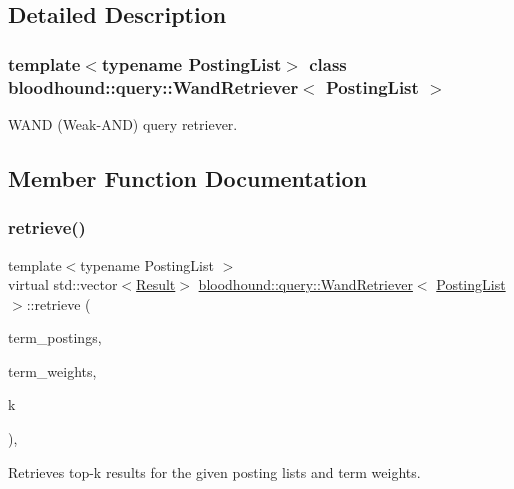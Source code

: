 \subsection{Detailed Description}
\subsubsection*{template$<$typename Posting\+List$>$\newline
class bloodhound\+::query\+::\+Wand\+Retriever$<$ Posting\+List $>$}

W\+A\+ND (Weak-\/\+A\+ND) query retriever. 

\subsection{Member Function Documentation}
\mbox{\label{classbloodhound_1_1query_1_1WandRetriever_a5f3068bc363c16c5b7255a925ea5af8c}} 
\subsubsection{\texorpdfstring{retrieve()}{retrieve()}}
{\footnotesize\ttfamily template$<$typename Posting\+List $>$ \\
virtual std\+::vector$<$\hyperlink{structbloodhound_1_1query_1_1Result}{Result}$>$ \hyperlink{classbloodhound_1_1query_1_1WandRetriever}{bloodhound\+::query\+::\+Wand\+Retriever}$<$ \hyperlink{classbloodhound_1_1PostingList}{Posting\+List} $>$\+::retrieve (\begin{DoxyParamCaption}\item[{const std\+::vector$<$ \hyperlink{classbloodhound_1_1PostingList}{Posting\+List} $>$ \&}]{term\+\_\+postings,  }\item[{const std\+::vector$<$ \hyperlink{structbloodhound_1_1Score}{Score} $>$ \&}]{term\+\_\+weights,  }\item[{std\+::size\+\_\+t}]{k }\end{DoxyParamCaption})\hspace{0.3cm}{\ttfamily [inline]}, {\ttfamily [virtual]}}



Retrieves top-\/k results for the given posting lists and term weights. 



